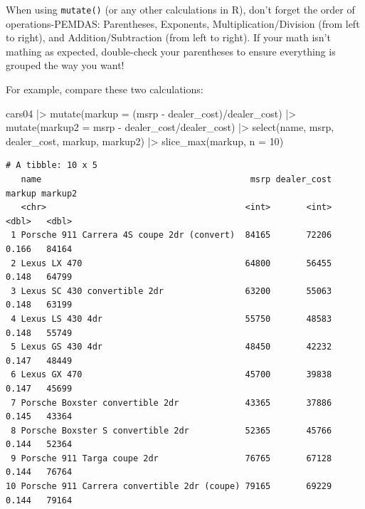 \documentclass[
  letterpaper,
]{book}
\newenvironment{Shaded}{\begin{snugshade}}{\end{snugshade}}
\newcommand{\AttributeTok}[1]{\textcolor[rgb]{0.40,0.45,0.13}{#1}}
\newcommand{\DecValTok}[1]{\textcolor[rgb]{0.68,0.00,0.00}{#1}}
\newcommand{\FunctionTok}[1]{\textcolor[rgb]{0.28,0.35,0.67}{#1}}
\newcommand{\NormalTok}[1]{\textcolor[rgb]{0.00,0.23,0.31}{#1}}
\newcommand{\SpecialCharTok}[1]{\textcolor[rgb]{0.37,0.37,0.37}{#1}}
\begin{document}
\begin{tcolorbox}[enhanced jigsaw, colframe=quarto-callout-tip-color-frame, breakable, arc=.35mm, bottomtitle=1mm, bottomrule=.15mm, colbacktitle=quarto-callout-tip-color!10!white, rightrule=.15mm, colback=white, opacityback=0, opacitybacktitle=0.6, coltitle=black, left=2mm, toptitle=1mm, toprule=.15mm, titlerule=0mm, leftrule=.75mm, title=\textcolor{quarto-callout-tip-color}{\faLightbulb}\hspace{0.5em}{Tip from the Helpdesk: Aunt Sally Who Needs to be Constantly Excused}]

When using \texttt{mutate()} (or any other calculations in R), don't
forget the order of operations-PEMDAS: Parentheses, Exponents,
Multiplication/Division (from left to right), and Addition/Subtraction
(from left to right). If your math isn't mathing as expected,
double-check your parentheses to ensure everything is grouped the way
you want!

For example, compare these two calculations:

\begin{Shaded}
\begin{Highlighting}[]
\NormalTok{cars04 }\SpecialCharTok{|\textgreater{}} 
  \FunctionTok{mutate}\NormalTok{(}\AttributeTok{markup =}\NormalTok{ (msrp }\SpecialCharTok{{-}}\NormalTok{ dealer\_cost)}\SpecialCharTok{/}\NormalTok{dealer\_cost) }\SpecialCharTok{|\textgreater{}} 
  \FunctionTok{mutate}\NormalTok{(}\AttributeTok{markup2 =}\NormalTok{ msrp }\SpecialCharTok{{-}}\NormalTok{ dealer\_cost}\SpecialCharTok{/}\NormalTok{dealer\_cost) }\SpecialCharTok{|\textgreater{}} 
  \FunctionTok{select}\NormalTok{(name, msrp, dealer\_cost, markup, markup2) }\SpecialCharTok{|\textgreater{}} 
  \FunctionTok{slice\_max}\NormalTok{(markup, }\AttributeTok{n =} \DecValTok{10}\NormalTok{)}
\end{Highlighting}
\end{Shaded}

\begin{verbatim}
# A tibble: 10 x 5
   name                                         msrp dealer_cost markup markup2
   <chr>                                       <int>       <int>  <dbl>   <dbl>
 1 Porsche 911 Carrera 4S coupe 2dr (convert)  84165       72206  0.166   84164
 2 Lexus LX 470                                64800       56455  0.148   64799
 3 Lexus SC 430 convertible 2dr                63200       55063  0.148   63199
 4 Lexus LS 430 4dr                            55750       48583  0.148   55749
 5 Lexus GS 430 4dr                            48450       42232  0.147   48449
 6 Lexus GX 470                                45700       39838  0.147   45699
 7 Porsche Boxster convertible 2dr             43365       37886  0.145   43364
 8 Porsche Boxster S convertible 2dr           52365       45766  0.144   52364
 9 Porsche 911 Targa coupe 2dr                 76765       67128  0.144   76764
10 Porsche 911 Carrera convertible 2dr (coupe) 79165       69229  0.144   79164
\end{verbatim}


\end{tcolorbox}
\end{document}
